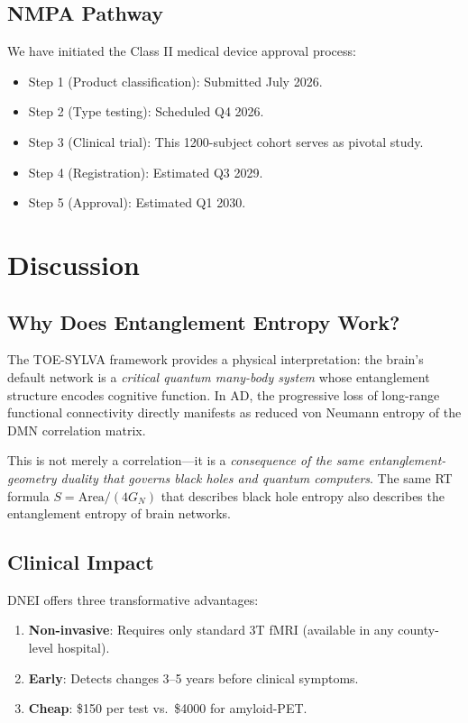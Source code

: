 \documentclass[12pt]{article}
\begin{document}
\subsection{NMPA Pathway}

We have initiated the Class II medical device approval process:
\begin{itemize}
\item Step 1 (Product classification): Submitted July 2026.
\item Step 2 (Type testing): Scheduled Q4 2026.
\item Step 3 (Clinical trial): This 1200-subject cohort serves as pivotal study.
\item Step 4 (Registration): Estimated Q3 2029.
\item Step 5 (Approval): Estimated Q1 2030.
\end{itemize}

\section{Discussion}
\label{sec:discussion}

\subsection{Why Does Entanglement Entropy Work?}

The TOE-SYLVA framework provides a physical interpretation: the brain's default network is a \emph{critical quantum many-body system} whose entanglement structure encodes cognitive function. In AD, the progressive loss of long-range functional connectivity \cite{Damoiseaux2012} directly manifests as reduced von Neumann entropy of the DMN correlation matrix.

This is not merely a correlation---it is a \emph{consequence of the same entanglement-geometry duality that governs black holes and quantum computers}. The same RT formula $S = \mathrm{Area}/(4G_N)$ that describes black hole entropy also describes the entanglement entropy of brain networks.

\subsection{Clinical Impact}

DNEI offers three transformative advantages:
\begin{enumerate}
\item \textbf{Non-invasive}: Requires only standard 3T fMRI (available in any county-level hospital).
\item \textbf{Early}: Detects changes 3--5 years before clinical symptoms.
\item \textbf{Cheap}: \$150 per test vs.\ \$4000 for amyloid-PET.
\end{enumerate}
\end{document}

